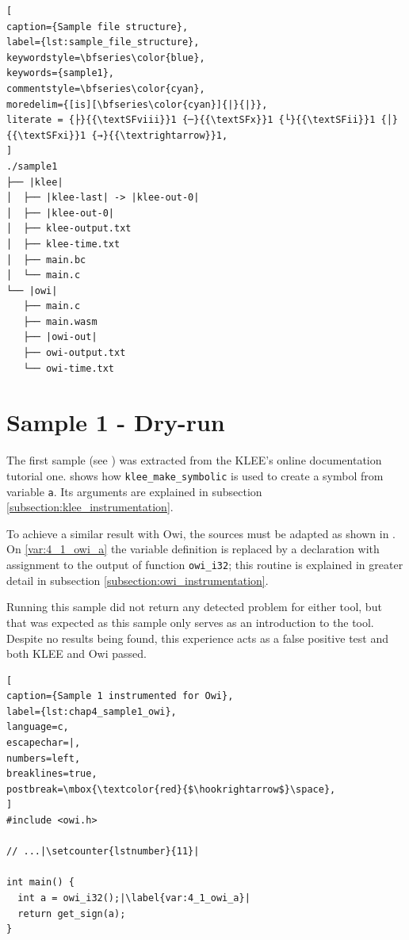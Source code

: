   
\begin{lstlisting}[
caption={Sample file structure},
label={lst:sample_file_structure},
keywordstyle=\bfseries\color{blue},
keywords={sample1},
commentstyle=\bfseries\color{cyan},
moredelim={[is][\bfseries\color{cyan}]{|}{|}},
literate = {├}{{\textSFviii}}1 {─}{{\textSFx}}1 {└}{{\textSFii}}1 {│}{{\textSFxi}}1 {→}{{\textrightarrow}}1,
]
./sample1
├── |klee|
│  ├── |klee-last| -> |klee-out-0|
│  ├── |klee-out-0|
│  ├── klee-output.txt
│  ├── klee-time.txt
│  ├── main.bc
│  └── main.c
└── |owi|
   ├── main.c
   ├── main.wasm
   ├── |owi-out|
   ├── owi-output.txt
   └── owi-time.txt
\end{lstlisting}

\section{Sample 1 - Dry-run}\label{section:sample_1}

The first sample (see ) was extracted from the KLEE's online documentation tutorial one.  shows how \lstinline$klee_make_symbolic$ is used to create a symbol from variable \lstinline$a$. Its arguments are explained in subsection \ref{subsection:klee_instrumentation}.

To achieve a similar result with Owi, the sources must be adapted as shown in . On \cref{var:4_1_owi_a} the variable definition is replaced by a declaration with assignment to the output of function \lstinline$owi_i32$; this routine is explained in greater detail in subsection \cref{subsection:owi_instrumentation}.

Running this sample did not return any detected problem for either tool, but that was expected as this sample only serves as an introduction to the tool. Despite no results being found, this experience acts as a false positive test and both KLEE and Owi passed.



\begin{lstlisting}[
caption={Sample 1 instrumented for Owi},
label={lst:chap4_sample1_owi},
language=c,
escapechar=|,
numbers=left,
breaklines=true,
postbreak=\mbox{\textcolor{red}{$\hookrightarrow$}\space},
]
#include <owi.h>

// ...|\setcounter{lstnumber}{11}|

int main() {
  int a = owi_i32();|\label{var:4_1_owi_a}|
  return get_sign(a);
}
\end{lstlisting}

